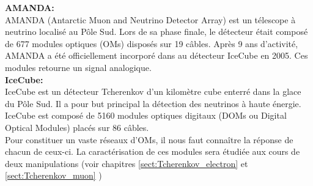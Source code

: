 \textbf{AMANDA:}\\
AMANDA (Antarctic Muon and Neutrino Detector Array) est un télescope à neutrino localisé au Pôle Sud. Lors de sa phase finale, le détecteur était composé de 677 modules optiques (OMs) disposés sur 19 câbles. Après 9 ans d'activité, AMANDA a été officiellement incorporé dans au détecteur IceCube en 2005. Ces modules retourne un signal analogique.\\

\textbf{IceCube:}\\
IceCube est un détecteur Tcherenkov d'un kilomètre cube enterré dans la glace du Pôle Sud. Il a pour but principal la détection des neutrinos à haute énergie. IceCube est composé de 5160 modules optiques digitaux (DOMs ou Digital Optical Modules) placés sur 86 câbles.\\

Pour constituer un vaste réseaux d'OMs, il nous faut connaître la réponse de chacun de ceux-ci. La caractérisation de ces modules sera étudiée aux cours de deux manipulations (voir chapitres \ref{sect:Tcherenkov_electron} et \ref{sect:Tcherenkov_muon} ) 